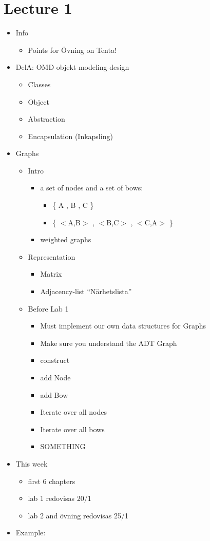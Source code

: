 \documentclass[11pt]{amsart}
\begin{document}
\section{Lecture 1}
\begin{itemize}
\item Info
	\begin{itemize}
	\item Points for \"{O}vning on Tenta!
	\end{itemize}
\item DelA: OMD objekt-modeling-design
	\begin{itemize}
	\item Classes
	\item Object
	\item Abstraction
	\item Encapsulation (Inkapsling)
	\end{itemize}
\item Graphs
	\begin{itemize}
	\item Intro
		\begin{itemize}
		\item a set of nodes and a set of bows: 
			\begin{itemize}
			\item \{ A , B , C \}
			\item \{ $<$A,B$>$ , $<$B,C$>$ , $<$C,A$>$ \}
			\end{itemize}
		\item weighted graphs
		\end{itemize}
	
	
	\item Representation
		\begin{itemize}
		\item Matrix
		\item Adjacency-list ``N\"{a}rhetslista''
		\end{itemize}
	\item Before Lab 1
		\begin{itemize}
		\item Must implement our own data structures for Graphs
		\item Make sure you understand the ADT Graph
		\item construct
		\item add Node
		\item add Bow
		\item Iterate over all nodes
		\item Iterate over all bows
		\item SOMETHING
		\end{itemize}
	\end{itemize}
\item This week
	\begin{itemize}
	\item first 6 chapters
	\item lab 1 redovisas 20/1
	\item lab 2 and \"{o}vning redovisas 25/1
	\end{itemize}
\item Example:
\end{itemize}
\end{document}
